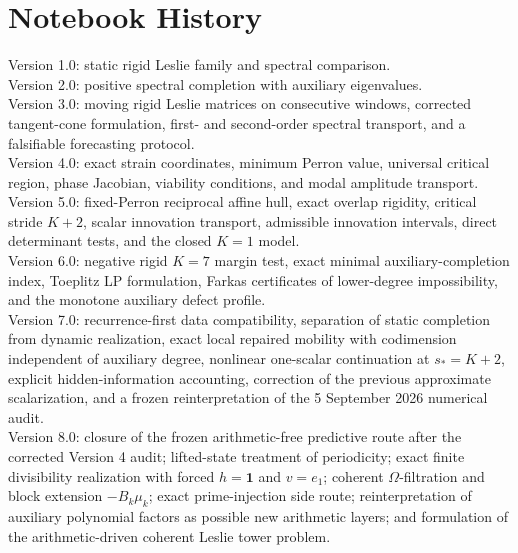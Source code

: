\documentclass[11pt]{amsart}
\numberwithin{equation}{section}
\theoremstyle{plain}
\theoremstyle{definition}
\theoremstyle{remark}
\begin{document}
\section*{Notebook History}
Version 1.0: static rigid Leslie family and spectral comparison.\\
Version 2.0: positive spectral completion with auxiliary eigenvalues.\\
Version 3.0: moving rigid Leslie matrices on consecutive windows, corrected tangent-cone formulation, first- and second-order spectral transport, and a falsifiable forecasting protocol.\\
Version 4.0: exact strain coordinates, minimum Perron value, universal critical region, phase Jacobian, viability conditions, and modal amplitude transport.\\
Version 5.0: fixed-Perron reciprocal affine hull, exact overlap rigidity, critical stride $K+2$, scalar innovation transport, admissible innovation intervals, direct determinant tests, and the closed $K=1$ model.\\
Version 6.0: negative rigid $K=7$ margin test, exact minimal auxiliary-completion index, Toeplitz LP formulation, Farkas certificates of lower-degree impossibility, and the monotone auxiliary defect profile.\\
Version 7.0: recurrence-first data compatibility, separation of static completion from dynamic realization, exact local repaired mobility with codimension independent of auxiliary degree, nonlinear one-scalar continuation at $s_*=K+2$, explicit hidden-information accounting, correction of the previous approximate scalarization, and a frozen reinterpretation of the 5 September 2026 numerical audit.\\
Version 8.0: closure of the frozen arithmetic-free predictive route after the corrected Version 4 audit; lifted-state treatment of periodicity; exact finite divisibility realization with forced $h=\mathbf1$ and $v=e_1$; coherent $\Omega$-filtration and block extension $-B_k\mu_k$; exact prime-injection side route; reinterpretation of auxiliary polynomial factors as possible new arithmetic layers; and formulation of the arithmetic-driven coherent Leslie tower problem.
\end{document}
